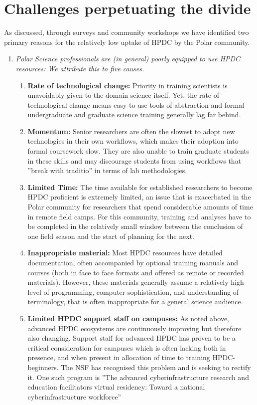 \documentclass[conference]{IEEEtran}
\begin{document}
\section{Challenges perpetuating the divide}
As discussed, through surveys and community workshops we have identified two primary reasons for the relatively low uptake of HPDC by the Polar community.  

\begin{enumerate}
\item \textit{Polar Science professionals are (in general) poorly equipped to use HPDC resources:
We attribute this to five causes.}
\begin{enumerate}
\item \textbf{Rate of technological change:} Priority in training scientists is unavoidably given to the domain science itself. Yet, the rate of technological change means easy-to-use tools of abstraction and formal undergraduate and graduate science training generally lag far behind. 
\item \textbf{Momentum: }Senior researchers are often the slowest to adopt new technologies in their own workflows, which makes their adoption into formal coursework slow. They are also unable to train graduate students in these skills and may discourage students from using workflows that ''break with traditio'' in terms of lab methodologies.
\item \textbf{Limited Time: }The time available for established researchers to become HPDC proficient is extremely limited, an issue that is exacerbated in the Polar community for researchers that spend considerable amounts of time in remote field camps. For this community, training and analyses have to be completed in the relatively small window between the conclusion of one field season and the start of planning for the next. 
\item \textbf{Inappropriate material: }Most HPDC resources have detailed documentation, often accompanied by optional training manuals and courses (both in face to face formats and offered as remote or recorded materials). However, these materials generally assume a relatively high level of programming, computer sophistication, and understanding of terminology, that is often inappropriate for a general science audience.  
\item \textbf{Limited HPDC support staff on campuses: } As noted above, advanced HPDC ecosystems are continuously improving but therefore also changing. Support staff for advanced HPDC has proven to be a critical consideration for campuses which is often lacking both in presence, and when present in allocation of time to training HPDC-beginners. The NSF has recognised this problem and is seeking to rectify it.  One such program is ''The advanced cyberinfrastructure research and education facilitators virtual residency: Toward a national cyberinfrastructure workforce''\cite{Neeman2016-uz}

\end{enumerate}
\end{enumerate}
\end{document}
